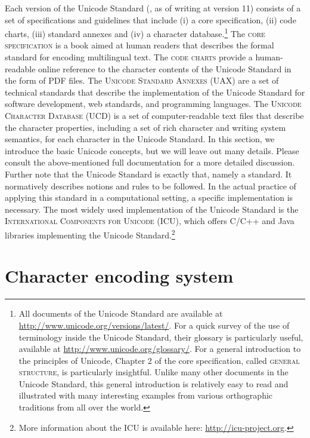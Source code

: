 Each version of the Unicode Standard (\citealp{Unicode2018}, as of writing at
version 11) consists of a set of specifications and guidelines that include (i) a
core specification, (ii) code charts, (iii) standard annexes and (iv) a
character database.\footnote{All documents of the Unicode Standard are available
at \url{http://www.unicode.org/versions/latest/}. For a quick survey of the use
of terminology inside the Unicode Standard, their glossary is particularly
useful, available at \url{http://www.unicode.org/glossary/}. For a general
introduction to the principles of Unicode, Chapter 2 of the core specification,
called \textsc{general structure}, is particularly insightful. Unlike 
many other documents in the Unicode Standard, this general introduction is
relatively easy to read and illustrated with many interesting examples from
various orthographic traditions from all over the world.} The \textsc{core
specification} is a book aimed at human readers that describes the formal
standard for encoding multilingual text. The \textsc{code charts} provide a
human-readable online reference to the character contents of the Unicode
Standard in the form of PDF files. The \textsc{Unicode Standard Annexes (UAX)}
are a set of technical standards that describe the implementation of the Unicode
Standard for software development, web standards, and programming languages.
The \textsc{Unicode Character Database (UCD)} is a set of computer-readable text
files that describe the character properties, including a set of rich character
and writing system semantics, for each character in the Unicode Standard. In
this section, we introduce the basic Unicode concepts, but we will leave out
many details. Please consult the above-mentioned full documentation for a more
detailed discussion. Further note that the Unicode Standard is exactly that,
namely a standard. It normatively describes notions and rules to be followed. In
the actual practice of applying this standard in a computational setting, a
specific implementation is necessary. The most widely used implementation of the
Unicode Standard is the \textsc{International Components for Unicode (ICU)},
which offers C/C++ and Java libraries implementing the Unicode
Standard.\footnote{More information about the ICU is available here:
\url{http://icu-project.org}.}

\section{Character encoding system}
\label{character-encoding-system}

